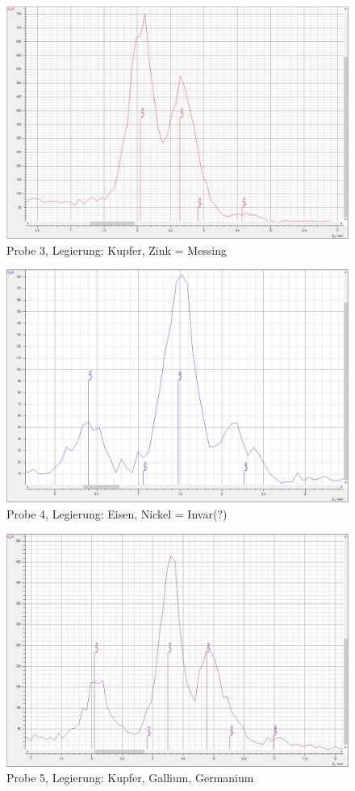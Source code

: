 \begin{figure}[H]
  \centering
  \includegraphics[width=\textwidth]{files/legierung3.jpg}
  \caption{Probe 3, Legierung: Kupfer, Zink = Messing}
  \label{fig:legierung3}
\end{figure}

\begin{figure}[H]
  \centering
  \includegraphics[width=\textwidth]{files/legierung4.jpg}
  \caption{Probe 4, Legierung: Eisen, Nickel = Invar(?)}
  \label{fig:legierung4}
\end{figure}


\begin{figure}[H]
  \centering
  \includegraphics[width=\textwidth]{files/legierung5.jpg}
  \caption{Probe 5, Legierung: Kupfer, Gallium, Germanium}
  \label{fig:legierung5}
\end{figure}
